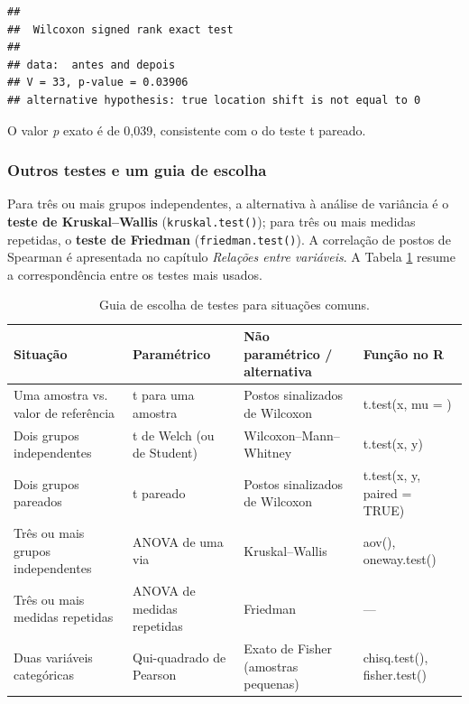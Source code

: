 \documentclass[
]{book}
\begin{document}
\begin{verbatim}
## 
##  Wilcoxon signed rank exact test
## 
## data:  antes and depois
## V = 33, p-value = 0.03906
## alternative hypothesis: true location shift is not equal to 0
\end{verbatim}

O valor \emph{p} exato é de 0,039, consistente com o do teste t pareado.

\subsubsection{Outros testes e um guia de escolha}\label{outros-testes-e-um-guia-de-escolha}

Para três ou mais grupos independentes, a alternativa à análise de variância é o \textbf{teste de Kruskal--Wallis} (\texttt{kruskal.test()}); para três ou mais medidas repetidas, o \textbf{teste de Friedman} (\texttt{friedman.test()}). A correlação de postos de Spearman é apresentada no capítulo \emph{Relações entre variáveis}. A Tabela \ref{tab:inf-guia} resume a correspondência entre os testes mais usados.

\begin{table}

\caption{\label{tab:inf-guia}Guia de escolha de testes para situações comuns.}
\centering
\begin{tabular}[t]{>{\raggedright\arraybackslash}p{2.7cm}|>{\raggedright\arraybackslash}p{2.3cm}|>{\raggedright\arraybackslash}p{2.6cm}|>{\raggedright\arraybackslash}p{2.5cm}}
\hline
Situação & Paramétrico & Não paramétrico / alternativa & Função no R\\
\hline
Uma amostra vs. valor de referência & t para uma amostra & Postos sinalizados de Wilcoxon & t.test(x, mu = )\\
\hline
Dois grupos independentes & t de Welch (ou de Student) & Wilcoxon–Mann–Whitney & t.test(x, y)\\
\hline
Dois grupos pareados & t pareado & Postos sinalizados de Wilcoxon & t.test(x, y, paired = TRUE)\\
\hline
Três ou mais grupos independentes & ANOVA de uma via & Kruskal–Wallis & aov(), oneway.test()\\
\hline
Três ou mais medidas repetidas & ANOVA de medidas repetidas & Friedman & —\\
\hline
Duas variáveis categóricas & Qui-quadrado de Pearson & Exato de Fisher (amostras pequenas) & chisq.test(), fisher.test()\\
\hline
\end{tabular}
\end{table}
\end{document}

